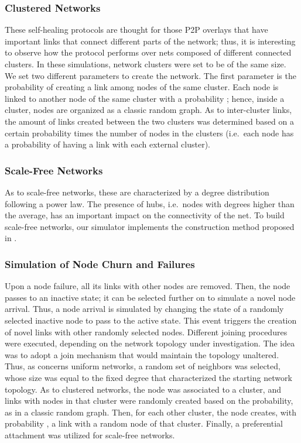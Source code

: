 \documentclass[10pt, conference, compsocconf]{IEEEtran}
\begin{document}
\subsubsection{Clustered Networks}
These self-healing protocols are thought for those P2P overlays that have important links that connect different parts of the network; thus, it is interesting to observe how the protocol performs over nets composed of different connected clusters.
In these simulations, network clusters were set to be of the same size.
We set two different parameters to create the network. The first parameter is the probability  of creating a link among nodes of the same cluster. Each node is linked to another node of the same cluster with a probability ; hence, inside a cluster, nodes are organized as a classic random graph.
As to inter-cluster links, the amount of links created between the two clusters was determined based on a certain probability  times the number of nodes in the clusters (i.e.~each node has a probability  of having a link with each external cluster).

\subsubsection{Scale-Free Networks}
As to scale-free networks, these are characterized by a degree distribution following a power law. 
The presence of hubs, i.e.~nodes with degrees higher than the average, has an important impact on the connectivity of the net. To build scale-free networks, our simulator implements the construction method proposed in \cite{Aiello00arandom}.

\subsubsection{Simulation of Node Churn and Failures}

Upon a node failure, all its links with other nodes are removed. Then, the node passes to an inactive state; it can be selected further on to simulate a novel node arrival.
Thus, a node arrival is simulated by changing the state of a randomly selected inactive node to pass to the active state. This event triggers the creation of novel links with other randomly selected nodes. 
Different joining procedures were executed, depending on the network topology under investigation. The idea was to adopt a join mechanism that would maintain the topology unaltered.
Thus, as concerns uniform networks, a random set of neighbors was selected, whose size was equal to the fixed degree that characterized the starting network topology.
As to clustered networks, the node was associated to a cluster, and links with nodes in that cluster were randomly created based on the  probability, as in a classic random graph. Then, for each other cluster, the node creates, with probability , a link with a random node of that cluster.
Finally, a preferential attachment was utilized for scale-free networks.
\end{document}
